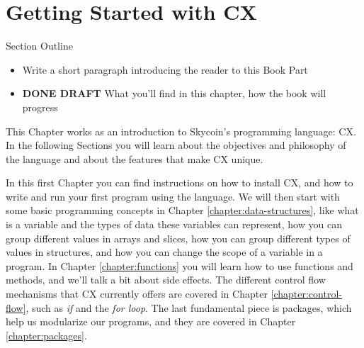 \documentclass[11pt,fleqn,openany]{book} %
\begin{document}
\tableofcontents %


\pagestyle{fancy} %



\chapter{Getting Started with CX}
\label{chapter:getting-started-with-cx}

\begin{remark}
Section Outline
    \begin{itemize}
    \item Write a short paragraph introducing the reader to this Book Part
    \item \textbf{DONE DRAFT} What you'll find in this chapter, how the book will progress
    \end{itemize}
\end{remark}

This Chapter works as an introduction to Skycoin's programming language: CX. In the following Sections you will learn about the objectives and philosophy of the language and about the features that make CX unique.

In this first Chapter you can find instructions on how to install CX, and how to write and run your first program using the language. We will then start with some basic programming concepts in Chapter \ref{chapter:data-structures}, like what is a variable and the types of data these variables can represent, how you can group different values in arrays and slices, how you can group different types of values in structures, and how you can change the scope of a variable in a program. In Chapter \ref{chapter:functions} you will learn how to use functions and methods, and we'll talk a bit about side effects. The different control flow mechanisms that CX currently offers are covered in Chapter \ref{chapter:control-flow}, such as \textit{if} and the \textit{for loop}. The last fundamental piece is packages, which help us modularize our programs, and they are covered in Chapter \ref{chapter:packages}.
\end{document}
